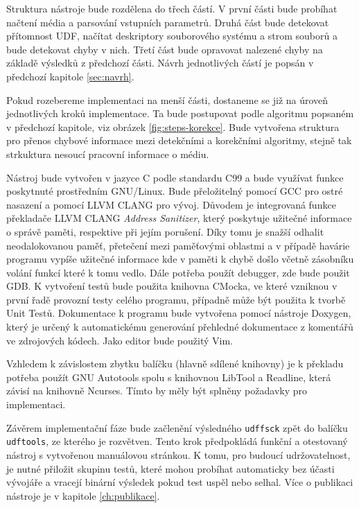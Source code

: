Struktura nástroje bude rozdělena do třech částí. V první části bude probíhat načtení média a parsování vstupních parametrů. Druhá část bude detekovat přítomnost UDF, načítat deskriptory souborového systému a strom souborů a bude detekovat chyby v nich. Třetí část bude opravovat nalezené chyby na základě výsledků z předchozí části. Návrh jednotlivých částí je popsán v předchozí kapitole \ref{sec:navrh}.

Pokud rozebereme implementaci na menší části, dostaneme se již na úroveň jednotlivých kroků implementace. Ta bude postupovat podle algoritmu popsaném v předchozí kapitole, viz obrázek \ref{fig:steps-korekce}. Bude vytvořena struktura pro přenos chybové informace mezi detekčními a korekčními algoritmy, stejně tak strkuktura nesoucí pracovní informace o médiu. 

Nástroj bude vytvořen v jazyce C podle standardu C99 a bude využívat funkce poskytnuté prostředním GNU/Linux. Bude přeložitelný pomocí GCC pro ostré nasazení a pomocí LLVM CLANG pro vývoj. Důvodem je integrovaná funkce překladače LLVM CLANG \textit{Address Sanitizer}, který poskytuje užitečné informace o správě paměti, respektive při jejím porušení. Díky tomu je snažší odhalit neodalokovanou paměť, přetečení mezi paměťovými oblastmi a v případě havárie programu vypíše užitečné informace kde v paměti k chybě došlo včetně zásobníku volání funkcí které k tomu vedlo. Dále potřeba použít debugger, zde bude použit GDB. K vytvoření testů bude použita knihovna CMocka, ve které vzniknou v první řadě provozní testy celého programu, případně může být použita k tvorbě Unit Testů. Dokumentace k programu bude vytvořena pomocí nástroje Doxygen, který je určený k automatickému generování přehledné dokumentace z komentářů ve zdrojových kódech. Jako editor bude použitý Vim.

Vzhledem k závislostem zbytku balíčku (hlavně sdílené knihovny) je k překladu potřeba použít GNU Autotools spolu s knihovnou LibTool a Readline, která závisí na knihovně Ncurses. Tímto by měly být splněny požadavky pro implementaci.

Závěrem implementační fáze bude začlenění výsledného \texttt{udffsck} zpět do balíčku \texttt{udftools}, ze kterého je rozvětven. Tento krok předpokládá funkční a otestovaný nástroj s vytvořenou manuálovou stránkou. K tomu, pro budoucí udržovatelnost, je nutné přiložit skupinu testů, které mohou probíhat automaticky bez účasti vývojáře a vracejí binární výsledek pokud test uspěl nebo selhal. Více o publikaci nástroje je v kapitole \ref{ch:publikace}.

